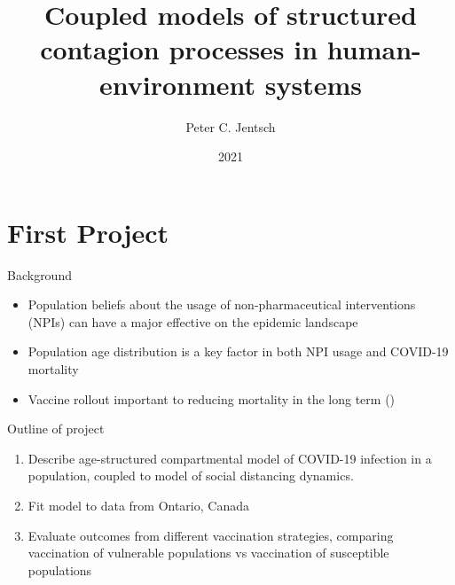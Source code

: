 \documentclass{beamer}
\title{Coupled models of structured contagion processes in human-environment systems}
\author{Peter C. Jentsch}
\institute[]{Department of Applied Mathematics, University Of Waterloo}
\date{2021}
\begin{document}

\section{First Project}
\begin{frame}{Background}
    \begin{itemize}
        \item Population beliefs about the usage of non-pharmaceutical interventions (NPIs) can have a major effective on the epidemic landscape
        \item Population age distribution is a key factor in both NPI usage and COVID-19 mortality
        \item Vaccine rollout important to reducing mortality in the long term (\cite{bubar2020model,hoyt2020vaccine})
    \end{itemize}
\end{frame}
\begin{frame}

    Outline of project
    \begin{enumerate}
        \item Describe age-structured compartmental model of COVID-19 infection in a population, coupled to model of social distancing dynamics. 
        \item Fit model to data from Ontario, Canada
        \item Evaluate outcomes from different vaccination strategies, comparing vaccination of vulnerable populations vs vaccination of susceptible populations
    \end{enumerate}
\end{frame}
\end{document}

